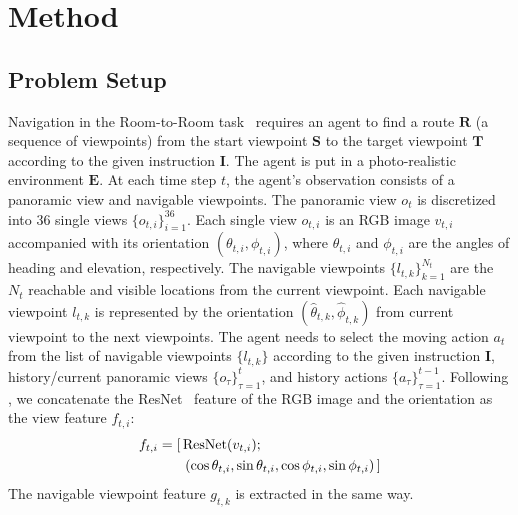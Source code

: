 \documentclass[11pt,a4paper]{article}
\begin{document}
\section{Method}
\label{sec:method}

\subsection{Problem Setup}
\label{sec:problem_setup}
Navigation in the Room-to-Room task~\cite{mattersim} requires an agent to find a route $\mathbf R$ (a sequence of viewpoints) from the start viewpoint $\mathbf{S}$ to the target viewpoint $\mathbf{T}$ according to the given instruction $\mathbf{I}$.
The agent is put in a photo-realistic environment $\mathbf{E}$. 
At each time step $t$, the agent's observation consists of a panoramic view and navigable viewpoints.
The panoramic view $o_t$ is discretized into $36$ single views $\{o_{t,i}\}_{i=1}^{36}$.
Each single view $o_{t,i}$ is an RGB image $v_{t,i}$ accompanied with its orientation $(\theta_{t,i}, \phi_{t,i})$, where $\theta_{t,i}$ and $\phi_{t,i}$ are the angles of heading and elevation, respectively.
The navigable viewpoints $\{l_{t,k}\}_{k=1}^{N_t}$ are the $N_t$ reachable and visible locations from the current viewpoint.
Each navigable viewpoint $l_{t,k}$ is represented by the orientation $(\hat\theta_{t,k}, \hat\phi_{t,k})$ from current viewpoint to the next viewpoints.
The agent needs to select the moving action $a_t$ from the list of navigable viewpoints $\{l_{t,k}\}$ according to the given instruction $\mathbf{I}$, history/current panoramic views $\{o_{\tau}\}_{\tau=1}^{t}$, and history actions $\{a_{\tau}\}_{\tau=1}^{t-1}$. 
Following , we concatenate the ResNet~\cite{he2016deep} feature of the RGB image and the orientation as the view feature $f_{t,i}$:
\begin{align}
\vspace{-10pt}
f_{t,i} = [\,&\mathrm{ResNet}(v_{t,i}); \nonumber \\ 
&\left(\cos \theta_{t,i}, \sin \theta_{t,i}, \cos \phi_{t,i}, \sin \phi_{t,i} \right)\, ]
\vspace{-10pt}
\end{align}
The navigable viewpoint feature $g_{t,k}$ is extracted in the same way.
\end{document}
